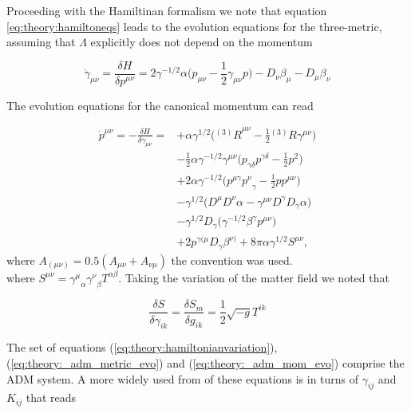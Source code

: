 \documentclass[11pt,a4paper,headinclude=true,DIV=14,BCOR=8mm,chapterprefix,listof=totoc,twoside,openright,abstracton]{scrbook}
\begin{document}
Proceeding with the Hamiltinan formalism we note that equation \ref{eq:theory:hamiltoneqs} leads to the evolution equations for the three-metric, assuming that $\Lambda$ explicitly does not depend on the momentum

\begin{equation}
    \dot{\gamma}_{\mu\nu} =\frac{\delta H}{\delta p^{\mu\nu}} = 2\gamma^{-1/2}\alpha\big(p_{\mu\nu}-\frac{1}{2}\gamma_{\mu\nu}p\big) - D_{\nu}\beta_{\mu}-D_{\mu}\beta_{\nu}
    \label{eq:theory:_adm_metric_evo}
\end{equation}

The evolution equations for the canonical momentum can read

\begin{align}
    \dot{p}^{\mu\nu} = -\frac{\delta H}{\delta \gamma_{\mu\nu}} = &+ \alpha\gamma^{1/2}\big({^{(3)}R}^{\mu\nu}-\frac{1}{2}{^{(3)}R\gamma^{\mu\nu}}\big) \\
    & - \frac{1}{2}\alpha\gamma^{-1/2}\gamma^{\mu\nu}\big(p_{\gamma\delta}p^{\gamma\delta}-\frac{1}{2}p^2\big) \\
    & + 2\alpha\gamma^{-1/2}\big(p^{\mu\gamma}{p^{\nu}}_{\gamma}-\frac{1}{2}pp^{\mu\nu}\big) \\
    & - \gamma^{1/2}\big(D^{\mu}D^{\nu}\alpha-\gamma^{\mu\nu}D^{\gamma}D_{\gamma}\alpha\big) \\
    & - \gamma^{1/2}D_{\gamma}\big(\gamma^{-1/2}\beta^{\gamma}p^{\mu\nu}\big) \\
    &+ 2p^{\gamma(\mu}D_{\gamma}\beta^{\nu)} + 8\pi \alpha \gamma^{1/2}S^{\mu\nu},
    \label{eq:theory:_adm_mom_evo}
\end{align}
where $A_{(\mu\nu)} = 0.5(A_{\mu\nu}+A_{\nu\mu})$ the convention was used. \\

where $S^{\mu\nu}={\gamma^{\mu}}_{\alpha}{\gamma^{\nu}}_{\beta}T^{\alpha\beta}$. 
Taking the variation of the matter field we noted that 


\begin{equation}
    \frac{\delta S}{\delta \gamma_{ik}} = \frac{\delta S_m}{\delta g_{ik}} = \frac{1}{2}\sqrt{-g}T^{ik}
\end{equation}

The set of equations (\ref{eq:theory:hamiltonianvariation}), (\ref{eq:theory:_adm_metric_evo}) and (\ref{eq:theory:_adm_mom_evo}) comprise the ADM system. A more widely used from of these equations is in turns of $\gamma_{ij}$ and $K_{ij}$ that reads
\end{document}
